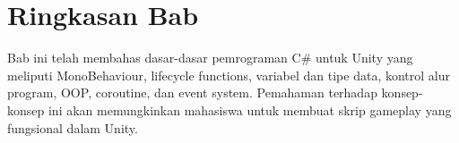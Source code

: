 \section{Ringkasan Bab}

Bab ini telah membahas dasar-dasar pemrograman C\# untuk Unity yang meliputi MonoBehaviour, lifecycle functions, variabel dan tipe data, kontrol alur program, OOP, coroutine, dan event system. Pemahaman terhadap konsep-konsep ini akan memungkinkan mahasiswa untuk membuat skrip gameplay yang fungsional dalam Unity.

